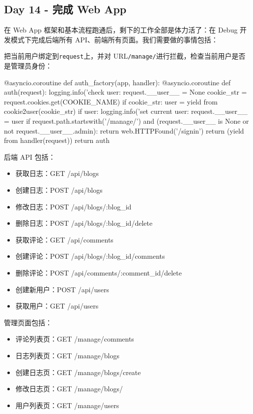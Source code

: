 \hypertarget{day-14---ux5b8cux6210-web-app}{%
\subsection{Day 14 - 完成 Web App}\label{day-14---ux5b8cux6210-web-app}}

在 Web App 框架和基本流程跑通后，剩下的工作全部是体力活了：在 Debug
开发模式下完成后端所有 API、前端所有页面。我们需要做的事情包括：

把当前用户绑定到\texttt{request}上，并对
URL\texttt{/manage/}进行拦截，检查当前用户是否是管理员身份：

\begin{pythoncode}
@asyncio.coroutine
def auth_factory(app, handler):
    @asyncio.coroutine
    def auth(request):
        logging.info('check user: %
        request.__user__ = None
        cookie_str = request.cookies.get(COOKIE_NAME)
        if cookie_str:
            user = yield from cookie2user(cookie_str)
            if user:
                logging.info('set current user: %
                request.__user__ = user
        if request.path.startswith('/manage/') and (request.__user__ is None or not request.__user__.admin):
            return web.HTTPFound('/signin')
        return (yield from handler(request))
    return auth
\end{pythoncode}

后端 API 包括：

\begin{itemize}
\item
  获取日志：GET /api/blogs
\item
  创建日志：POST /api/blogs
\item
  修改日志：POST /api/blogs/:blog\_id
\item
  删除日志：POST /api/blogs/:blog\_id/delete
\item
  获取评论：GET /api/comments
\item
  创建评论：POST /api/blogs/:blog\_id/comments
\item
  删除评论：POST /api/comments/:comment\_id/delete
\item
  创建新用户：POST /api/users
\item
  获取用户：GET /api/users
\end{itemize}

管理页面包括：

\begin{itemize}
\item
  评论列表页：GET /manage/comments
\item
  日志列表页：GET /manage/blogs
\item
  创建日志页：GET /manage/blogs/create
\item
  修改日志页：GET /manage/blogs/
\item
  用户列表页：GET /manage/users
\end{itemize}

